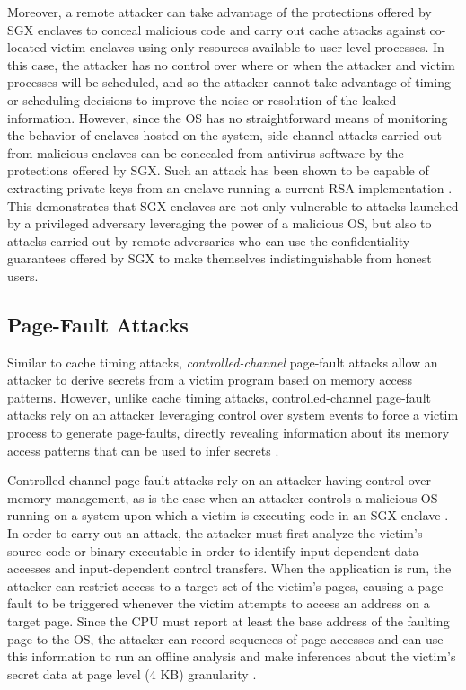 Moreover, a remote attacker can take advantage of the protections offered by SGX enclaves to conceal malicious code and carry out cache attacks against co-located victim enclaves using only resources available to user-level processes. In this case, the attacker has no control over where or when the attacker and victim processes will be scheduled, and so the attacker cannot take advantage of timing or scheduling decisions to improve the noise or resolution of the leaked information. However, since the OS has no straightforward means of monitoring the behavior of enclaves hosted on the system, side channel attacks carried out from malicious enclaves can be concealed from antivirus software by the protections offered by SGX. Such an attack has been shown to be capable of extracting private keys from an enclave running a current RSA implementation \cite{schwarz_malware_2017}. This demonstrates that SGX enclaves are not only vulnerable to attacks launched by a privileged adversary leveraging the power of a malicious OS, but also to attacks carried out by remote adversaries who can use the confidentiality guarantees offered by SGX to make themselves indistinguishable from honest users.

\subsection{Page-Fault Attacks}

Similar to cache timing attacks, \emph{controlled-channel} page-fault attacks allow an attacker to derive secrets from a victim program based on memory access patterns. However, unlike cache timing attacks, controlled-channel page-fault attacks rely on an attacker leveraging control over system events to force a victim process to generate page-faults, directly revealing information about its memory access patterns that can be used to infer secrets \cite{xu_controlled-channel_2015}.

Controlled-channel page-fault attacks rely on an attacker having control over memory management, as is the case when an attacker controls a malicious OS running on a system upon which a victim is executing code in an SGX enclave \cite{intel_corporation_tutorial_2015}. In order to carry out an attack, the attacker must first analyze the victim's source code or binary executable in order to identify input-dependent data accesses and input-dependent control transfers. When the application is run, the attacker can restrict access to a target set of the victim's pages, causing a page-fault to be triggered whenever the victim attempts to access an address on a target page. Since the CPU must report at least the base address of the faulting page to the OS, the attacker can record sequences of page accesses and can use this information to run an offline analysis and make inferences about the victim's secret data at page level (4 KB) granularity \cite{xu_controlled-channel_2015, shinde_preventing_2015}.

